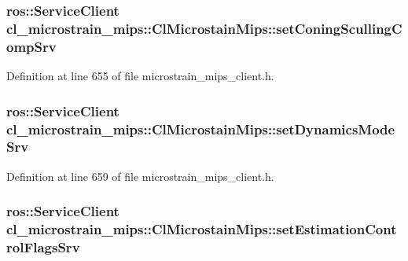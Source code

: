 \subsubsection[{\texorpdfstring{set\+Coning\+Sculling\+Comp\+Srv}{setConingScullingCompSrv}}]{\setlength{\rightskip}{0pt plus 5cm}ros\+::\+Service\+Client cl\+\_\+microstrain\+\_\+mips\+::\+Cl\+Microstain\+Mips\+::set\+Coning\+Sculling\+Comp\+Srv\hspace{0.3cm}{\ttfamily [protected]}}\hypertarget{classcl__microstrain__mips_1_1ClMicrostainMips_ae24545c615e2be170adced3999d94d84}{}\label{classcl__microstrain__mips_1_1ClMicrostainMips_ae24545c615e2be170adced3999d94d84}


Definition at line 655 of file microstrain\+\_\+mips\+\_\+client.\+h.

\subsubsection[{\texorpdfstring{set\+Dynamics\+Mode\+Srv}{setDynamicsModeSrv}}]{\setlength{\rightskip}{0pt plus 5cm}ros\+::\+Service\+Client cl\+\_\+microstrain\+\_\+mips\+::\+Cl\+Microstain\+Mips\+::set\+Dynamics\+Mode\+Srv\hspace{0.3cm}{\ttfamily [protected]}}\hypertarget{classcl__microstrain__mips_1_1ClMicrostainMips_a43a684f4010debc4a2ba17d9784712d6}{}\label{classcl__microstrain__mips_1_1ClMicrostainMips_a43a684f4010debc4a2ba17d9784712d6}


Definition at line 659 of file microstrain\+\_\+mips\+\_\+client.\+h.

\subsubsection[{\texorpdfstring{set\+Estimation\+Control\+Flags\+Srv}{setEstimationControlFlagsSrv}}]{\setlength{\rightskip}{0pt plus 5cm}ros\+::\+Service\+Client cl\+\_\+microstrain\+\_\+mips\+::\+Cl\+Microstain\+Mips\+::set\+Estimation\+Control\+Flags\+Srv\hspace{0.3cm}{\ttfamily [protected]}}\hypertarget{classcl__microstrain__mips_1_1ClMicrostainMips_a2eeff01aea4a41fd5d24ff2f77daf584}{}\label{classcl__microstrain__mips_1_1ClMicrostainMips_a2eeff01aea4a41fd5d24ff2f77daf584}


